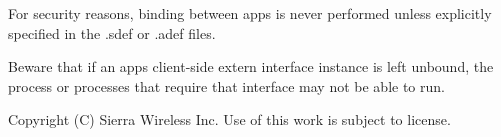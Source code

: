 For security reasons, binding between apps is never performed unless explicitly specified in the {\ttfamily }.sdef or {\ttfamily }.adef files.

Beware that if an app\textquotesingle{}s client-\/side extern interface instance is left unbound, the process or processes that require that interface may not be able to run.





Copyright (C) Sierra Wireless Inc. Use of this work is subject to license. 